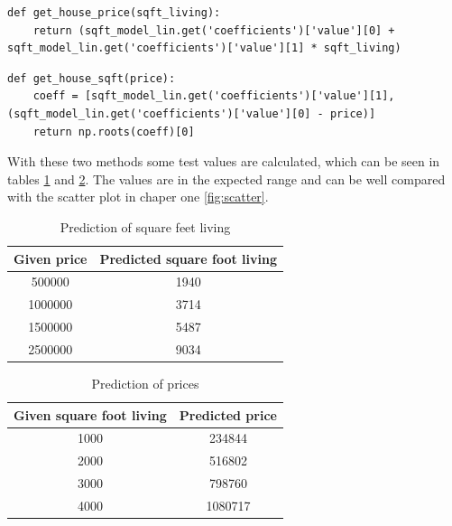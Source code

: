 \documentclass[12pt]{scrreprt}
\begin{document}
\begin{lstlisting}
def get_house_price(sqft_living):
    return (sqft_model_lin.get('coefficients')['value'][0] + sqft_model_lin.get('coefficients')['value'][1] * sqft_living)
\end{lstlisting}

\begin{lstlisting}
def get_house_sqft(price):
    coeff = [sqft_model_lin.get('coefficients')['value'][1], (sqft_model_lin.get('coefficients')['value'][0] - price)]
    return np.roots(coeff)[0]
\end{lstlisting}

\vspace{0.5cm}
With these two methods some test values are calculated, which can be seen in tables \ref{tab:predict_sqft} and \ref{tab:predict_price}. The values are in the expected range and can be well compared with the scatter plot in chaper one \ref{fig:scatter}.\\


\begin{table}[H]
  \caption{Prediction of square feet living}
  \label{tab:predict_sqft}
\begin{center}
  \begin{tabular}{| c | c |}
    \hline
    \textbf{Given price} & \textbf{Predicted square foot living}\\
    \hline
    \hline
    500000 & 1940 \\ \hline
    1000000 & 3714 \\ \hline
    1500000 & 5487 \\ \hline
    2500000 & 9034 \\ \hline
  \end{tabular}
\end{center}
\end{table}

\begin{table}[H]
  \caption{Prediction of prices}
  \label{tab:predict_price}
\begin{center}
  \begin{tabular}{| c | c |}
    \hline
    \textbf{Given square foot living} & \textbf{Predicted price}\\
    \hline
    \hline
    1000 & 234844 \\ \hline
    2000 & 516802 \\ \hline
    3000 & 798760 \\ \hline
    4000 & 1080717 \\ \hline
  \end{tabular}
\end{center}
\end{table}
\end{document}
